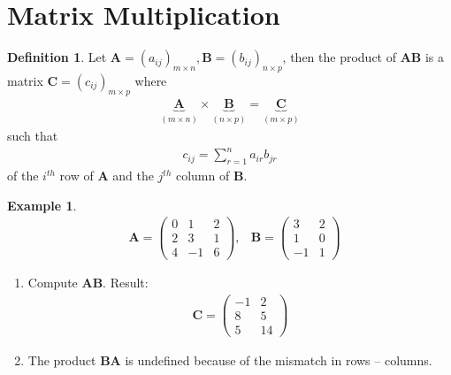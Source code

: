 \documentclass[10pt,a4paper]{book}
\theoremstyle{definition}\newtheorem{definition}{Definition}
\theoremstyle{definition}\newtheorem{fact}{Fact}
\theoremstyle{definition}\newtheorem{ex}{Ex.}
\theoremstyle{definition}\newtheorem{project}{Project}
\theoremstyle{definition}\newtheorem{problem}{Problem}
\theoremstyle{definition}\newtheorem{example}{Example}
\numberwithin{theorem}{chapter}
\numberwithin{corollary}{chapter}
\numberwithin{assumption}{chapter}
\numberwithin{definition}{chapter}
\numberwithin{prop}{chapter}
\numberwithin{notation}{chapter}
\numberwithin{problem}{chapter}
\numberwithin{example}{chapter}
\numberwithin{fact}{chapter}
\numberwithin{ex}{chapter}
\newenvironment{fdefinition}
{\begin{mdframed}\begin{definition}}
		{\end{definition}\end{mdframed}}
\def\A{\mathbf A}
\def\B{\mathbf B}
\def\C{\mathbf C}
\begin{document}
	\section{Matrix Multiplication}
	
	\begin{fdefinition}
		Let $\A = (a_{ij})_{m\times n}, \B = (b_{ij})_{n\times p}$, then the product of $\A \B$ is a matrix $\C = (c_{ij})_{m \times p}$ where 
		\begin{align*}
			\underbrace{\A}_{(m\times n)} \times \underbrace{\B}_{(n\times p)} = \underbrace{\C}_{(m \times p)} 
		\end{align*}
		such that
		\begin{align*}
			c_{ij} = \sum_{r=1}^{n} a_{ir} b_{jr} 
		\end{align*}
		of the $i^{th}$ row of $\A$ and the $j^{th}$ column of $\B$.
	\end{fdefinition}
	
	\begin{example}
		\begin{align*}
			&\A= \begin{pmatrix}
				0 & 1  & 2 \\
				2 & 3  & 1 \\
				4 & -1 & 6 
			\end{pmatrix}, &
			\B = \begin{pmatrix}
				3 & 2  \\
				1 & 0 \\
				-1 & 1
			\end{pmatrix}
		\end{align*}
		\begin{enumerate}
			\item Compute $\A \B$. Result:
			\begin{align*}
				\C = \begin{pmatrix}
					-1 & 2  \\
					8  & 5  \\
					5  & 14 
				\end{pmatrix}
			\end{align*}
			\item The product $\B \A$ is undefined because of the mismatch in rows -- columns.
		\end{enumerate}
	\end{example}
	
\end{document}
